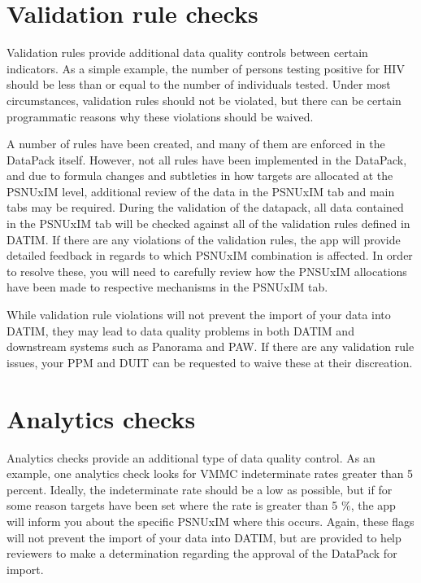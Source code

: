 \documentclass[
  openany]{book}
\begin{document}
\hypertarget{validation-rule-checks}{%
\section{Validation rule checks}\label{validation-rule-checks}}

Validation rules provide additional data quality controls between
certain indicators. As a simple example, the number of persons testing
positive for HIV should be less than or equal to the number of
individuals tested. Under most circumstances, validation rules should
not be violated, but there can be certain programmatic reasons why these
violations should be waived.

A number of rules have been created, and many of them are enforced in
the DataPack itself. However, not all rules have been implemented in the
DataPack, and due to formula changes and subtleties in how targets are
allocated at the PSNUxIM level, additional review of the data in the
PSNUxIM tab and main tabs may be required. During the validation of the
datapack, all data contained in the PSNUxIM tab will be checked against
all of the validation rules defined in DATIM. If there are any
violations of the validation rules, the app will provide detailed
feedback in regards to which PSNUxIM combination is affected. In order
to resolve these, you will need to carefully review how the PNSUxIM
allocations have been made to respective mechanisms in the PSNUxIM tab.

While validation rule violations will not prevent the import of your
data into DATIM, they may lead to data quality problems in both DATIM
and downstream systems such as Panorama and PAW. If there are any
validation rule issues, your PPM and DUIT can be requested to waive
these at their discreation.

\hypertarget{analytics-checks}{%
\section{Analytics checks}\label{analytics-checks}}

Analytics checks provide an additional type of data quality control. As
an example, one analytics check looks for VMMC indeterminate rates
greater than 5 percent. Ideally, the indeterminate rate should be a low
as possible, but if for some reason targets have been set where the rate
is greater than 5 \%, the app will inform you about the specific PSNUxIM
where this occurs. Again, these flags will not prevent the import of
your data into DATIM, but are provided to help reviewers to make a
determination regarding the approval of the DataPack for import.
\end{document}
